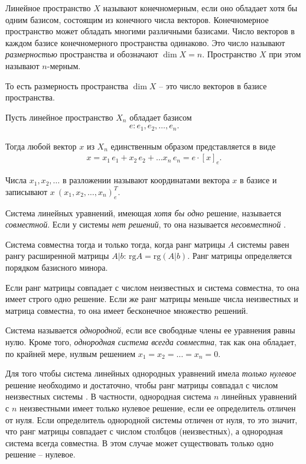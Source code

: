 \documentclass[%
	11pt,
	a4paper,
	utf8,
		]{article}
\begin{document}
Линейное пространство $ X $ называют конечномерным, если оно обладает хотя бы одним базисом, состоящим из конечного числа векторов. Конечномерное пространство может обладать многими различными базисами. Число векторов в каждом базисе конечномерного пространства одинаково. Это число называют \emph{размерностью} пространства и обозначают $ \dim X = n $. Пространство $ X $ при этом называют $ n $-мерным.

То есть размерность пространства $ \dim X $ -- это число векторов в базисе пространства.

Пусть линейное пространство $ X_n $ обладает базисом
\begin{align*}
	e: e_1, e_2, \ldots, e_n.
\end{align*}

Тогда любой вектор $ x $ из $ X_n $ единственным образом представляется в виде
\begin{align*}
	x = x_1 \, e_1 + x_2 \, e_2 + \ldots x_n \, e_n = e \cdot [x]_e.
\end{align*}

Числа $ x_1, x_2, \ldots $ в разложении называют координатами вектора $ x $ в базисе и записывают $ x \ (x_1, x_2, \ldots, x_n)^T_e $. 

Система линейных уравнений, имеющая \emph{хотя бы одно} решение, называется \emph{совместной}. Если у системы \emph{нет решений}, то она называется \emph{несовместной} \cite[]{shevtsov:linal-2012}.

Система совместна тогда и только тогда, когда ранг матрицы $ A $ системы равен рангу расширенной матрицы $ A | b $: $ \text{rg} A = \text{rg} (A | b) $. Ранг матрицы определяется порядком базисного минора.

Если ранг матрицы совпадает с числом неизвестных и система совместна, то она имеет строго одно решение. Если же ранг матрицы меньше числа неизвестных и матрица совместна, то она имеет бесконечное множество решений.

Система называется \emph{однородной}, если все свободные члены ее уравнения равны нулю. Кроме того, \emph{однородная система всегда совместна}, так как она обладает, по крайней мере, нулвым решением $ x_1 = x_2 = \ldots = x_n = 0 $.

Для того чтобы система линейных однородных уравнений имела \emph{только нулевое} решение необходимо и достаточно, чтобы ранг матрицы совпадал с числом неизвестных системы \cite[]{shevtsov:linal-2012}. В частности, однородная система $ n $ линейных уравнений с $ n $ неизвестными имеет только нулевое решение, если ее определитель отличен от нуля. Если определитель однородной системы отличен от нуля, то это значит, что ранг матрицы совпадает с числом столбцов (неизвестных), а однородная система всегда совместна. В этом случае может существовать только одно решение -- нулевое.
\end{document}
